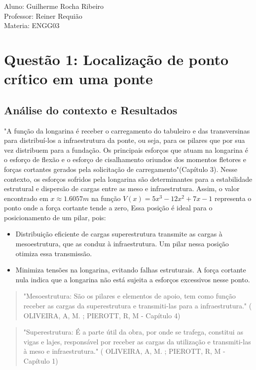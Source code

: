 \documentclass{article}
\begin{document}
\begin{flushleft}
Aluno: Guilherme Rocha Ribeiro \\
Professor: Reiner Requião \\
Materia: ENGG03
\end{flushleft}

\section*{Questão 1: Localização de ponto crítico em uma ponte}
\justifying

\subsection*{Análise do contexto e Resultados}
"A função da longarina é receber o carregamento do tabuleiro e das transversinas para distribuí-los a infraestrutura da ponte, ou seja, para os pilares 
que por sua vez distribuem para a fundação. Os principais esforços que atuam na longarina é o esforço de flexão e o esforço de cisalhamento oriundos dos 
momentos fletores e forças cortantes gerados pela solicitação de carregamento"\cite{oliveira2016}(Capítulo 3). Nesse contexto, os esforços sofridos pela longarina são determinantes para a estabilidade estrutural e dispersão de cargas entre as meso e infraestrutura.
Assim, o valor encontrado em $x \approx 1.6057m$ na função $V(x) = 5x^3 - 12x^2 + 7x - 1$ representa o ponto onde a força cortante tende a zero, Essa posição é ideal para o posicionamento de um pilar, pois:

\begin{itemize}
\item Distribuição eficiente de cargas superestrutura transmite as cargas à mesoestrutura, que as conduz à infraestrutura. Um pilar nessa posição otimiza essa transmissão.
\item Minimiza tensões na longarina, evitando falhas estruturais. A força cortante nula indica que a longarina não está sujeita a esforços excessivos nesse ponto.
\end{itemize}


\begin{quote}
"Mesoestrutura: São os pilares e elementos de apoio, tem como função receber as cargas da superestrutura e transmiti-las para a infraestrutura." ( OLIVEIRA, A, M. ; PIEROTT, R, M - Capítulo 4) \cite{oliveira2016}   
\end{quote}

\begin{quote}
"Superestrutura: É a parte útil da obra, por onde se trafega, constitui as vigas e lajes, responsável por receber as cargas da utilização e transmiti-las à meso e infraestrutura." ( OLIVEIRA, A, M. ; PIEROTT, R, M - Capítulo 1) \cite{oliveira2016}
\end{quote}
\end{document}
